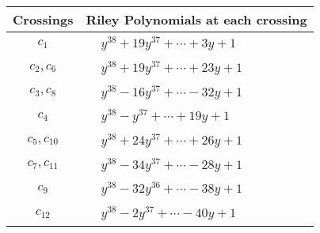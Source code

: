 \documentclass[1p]{elsarticle_modified}
\theoremstyle{definition}
\begin{document}
\begin{tabular}{m{50pt}|m{274pt}}
Crossings & \hspace{64pt}Riley Polynomials at each crossing \\
\hline $$\begin{aligned}c_{1}\end{aligned}$$&$\begin{aligned}
&y^{38}+19 y^{37}+\cdots+3 y+1
\end{aligned}$\\
\hline $$\begin{aligned}c_{2},c_{6}\end{aligned}$$&$\begin{aligned}
&y^{38}+19 y^{37}+\cdots+23 y+1
\end{aligned}$\\
\hline $$\begin{aligned}c_{3},c_{8}\end{aligned}$$&$\begin{aligned}
&y^{38}-16 y^{37}+\cdots-32 y+1
\end{aligned}$\\
\hline $$\begin{aligned}c_{4}\end{aligned}$$&$\begin{aligned}
&y^{38}- y^{37}+\cdots+19 y+1
\end{aligned}$\\
\hline $$\begin{aligned}c_{5},c_{10}\end{aligned}$$&$\begin{aligned}
&y^{38}+24 y^{37}+\cdots+26 y+1
\end{aligned}$\\
\hline $$\begin{aligned}c_{7},c_{11}\end{aligned}$$&$\begin{aligned}
&y^{38}-34 y^{37}+\cdots-28 y+1
\end{aligned}$\\
\hline $$\begin{aligned}c_{9}\end{aligned}$$&$\begin{aligned}
&y^{38}-32 y^{36}+\cdots-38 y+1
\end{aligned}$\\
\hline $$\begin{aligned}c_{12}\end{aligned}$$&$\begin{aligned}
&y^{38}-2 y^{37}+\cdots-40 y+1
\end{aligned}$\\
\hline
\end{tabular}\\~\\
\end{document}
